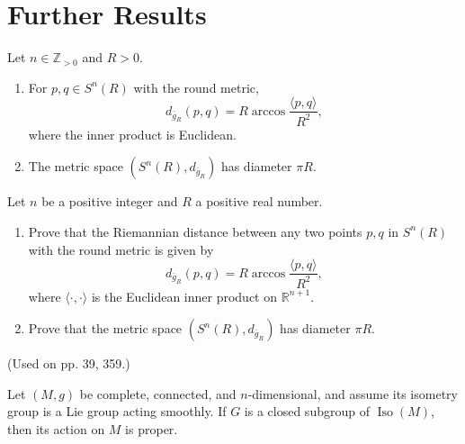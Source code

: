 \section{Further Results}

\begin{proposition}
\label{prop:round-metric-distance-sphere}

Let $n\in\mathbb Z_{>0}$ and $R>0$.
\begin{enumerate}
\item[(a)] For $p,q\in S^n(R)$ with the round metric,
\[
d_{\bar g_R}(p,q)=R\arccos\frac{\langle p,q\rangle}{R^2},
\]
where the inner product is Euclidean.
\item[(b)] The metric space $(S^n(R),d_{\bar g_R})$ has diameter $\pi R$.
\end{enumerate}
\end{proposition}

\begin{exercise}
\label{prob:round-metric-distance-sphere}

Let $n$ be a positive integer and $R$ a positive real number.
\begin{enumerate}
\item[(a)] Prove that the Riemannian distance between any two points $p, q$ in $S^n(R)$ with the round metric is given by
\[
d_{\bar{g}_R}(p,q) = R \arccos \frac{\langle p,q\rangle}{R^2},
\]
where $\langle\cdot,\cdot\rangle$ is the Euclidean inner product on $\mathbb{R}^{n+1}$.
\item[(b)] Prove that the metric space $(S^n(R), d_{\bar{g}_R})$ has diameter $\pi R$.
\end{enumerate}
(Used on pp. 39, 359.)
\end{exercise}


\begin{proposition}
\label{prop:isometry-group-acts-properly}

Let $(M,g)$ be complete, connected, and $n$-dimensional, and assume its
isometry group is a Lie group acting smoothly.  If $G$ is a closed subgroup of
$\operatorname{Iso}(M)$, then its action on $M$ is proper.
\end{proposition}


